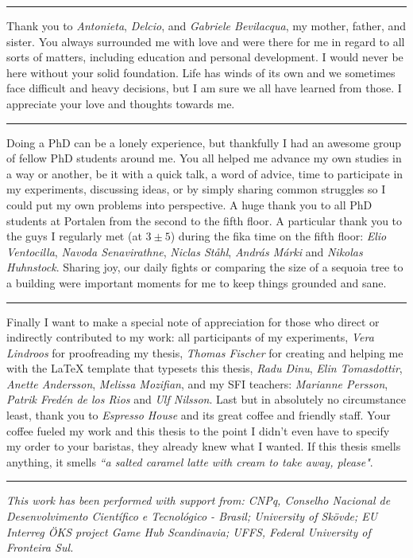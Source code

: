 \vspace{7pt}\hrule\vspace{5pt}

Thank you to \textit{Antonieta}, \textit{Delcio}, and \textit{Gabriele Bevilacqua}, my mother, father, and sister. You always surrounded me with love and were there for me in regard to all sorts of matters, including education and personal development. I would never be here without your solid foundation. Life has winds of its own and we sometimes face difficult and heavy decisions, but I am sure we all have learned from those. I appreciate your love and thoughts towards me.

\vspace{7pt}\hrule\vspace{5pt}

Doing a PhD can be a lonely experience, but thankfully I had an awesome group of fellow PhD students around me. You all helped me advance my own studies in a way or another, be it with a quick talk, a word of advice, time to participate in my experiments, discussing ideas, or by simply sharing common struggles so I could put my own problems into perspective. A huge thank you to all PhD students at Portalen from the second to the fifth floor. A particular thank you to the guys I regularly met (at $3\pm5$) during the fika time on the fifth floor: \textit{Elio Ventocilla}, \textit{Navoda Senavirathne}, \textit{Niclas St{\aa}hl}, \textit{Andr{\'a}s M{\'a}rki} and \textit{Nikolas Huhnstock}. Sharing joy, our daily fights or comparing the size of a sequoia tree to a building were important moments for me to keep things grounded and sane.

\vspace{7pt}\hrule\vspace{5pt}

Finally I want to make a special note of appreciation for those who direct or indirectly contributed to my work: all participants of my experiments, \textit{Vera Lindroos} for proofreading my thesis, \textit{Thomas Fischer} for creating and helping me with the {\LaTeX} template that typesets this thesis, \textit{Radu Dinu}, \textit{Elin Tomasdottir}, \textit{Anette Andersson}, \textit{Melissa Mozifian}, and my SFI teachers: \textit{Marianne Persson}, \textit{Patrik Fred{\'e}n de los Rios} and \textit{Ulf Nilsson}. Last but in absolutely no circumstance least, thank you to \textit{Espresso House} and its great coffee and friendly staff. Your coffee fueled my work and this thesis to the point I didn't even have to specify my order to your baristas, they already knew what I wanted. If this thesis smells anything, it smells \textit{``a salted caramel latte with cream to take away, please"}.

\vspace{7pt}\hrule\vspace{5pt}

\textit{This work has been performed with support from: CNPq, Conselho Nacional de Desenvolvimento Cient\'{i}fico e Tecnol\'{o}gico - Brasil; University of Sk\"ovde; EU Interreg \"OKS project Game Hub Scandinavia; UFFS, Federal University of Fronteira Sul.}
